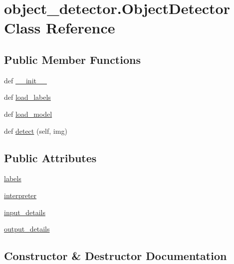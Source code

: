 \hypertarget{classobject__detector_1_1ObjectDetector}{}\section{object\+\_\+detector.\+Object\+Detector Class Reference}
\label{classobject__detector_1_1ObjectDetector}
\subsection*{Public Member Functions}
\begin{DoxyCompactItemize}
\item 
def \hyperlink{classobject__detector_1_1ObjectDetector_a798b45f16d50dc89ba57bfa4369fd01d}{\+\_\+\+\_\+init\+\_\+\+\_\+}
\item 
def \hyperlink{classobject__detector_1_1ObjectDetector_aaad9724f89d4803c10c0ab346c6b9121}{load\+\_\+labels}
\item 
def \hyperlink{classobject__detector_1_1ObjectDetector_a230551f06d7906793bfa1e44654fdefe}{load\+\_\+model}
\item 
def \hyperlink{classobject__detector_1_1ObjectDetector_ab03e2a22955f2438ee905377938a72ee}{detect} (self, img)
\end{DoxyCompactItemize}
\subsection*{Public Attributes}
\begin{DoxyCompactItemize}
\item 
\hyperlink{classobject__detector_1_1ObjectDetector_ae111e0c0f55d86a47ed7209ca249f5a2}{labels}
\item 
\hyperlink{classobject__detector_1_1ObjectDetector_a64136107df666740de86c933278a8460}{interpreter}
\item 
\hyperlink{classobject__detector_1_1ObjectDetector_abffe93fe0cff55ce4038679483cab0a2}{input\+\_\+details}
\item 
\hyperlink{classobject__detector_1_1ObjectDetector_a167991814c90ee1c872fad8ac9a0b6ec}{output\+\_\+details}
\end{DoxyCompactItemize}


\subsection{Constructor \& Destructor Documentation}
\mbox{\label{classobject__detector_1_1ObjectDetector_a798b45f16d50dc89ba57bfa4369fd01d}} 
